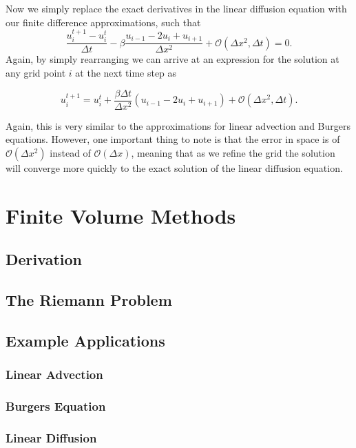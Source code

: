 Now we simply replace the exact derivatives in the linear diffusion equation with our finite difference approximations, such that
\begin{equation}
\frac{u_i^{t+1} - u_{i}^t}{\Delta t} - \beta \frac{u_{i-1} - 2u_i + u_{i+1}}{\Delta x^2} + \mathcal{O}(\Delta x^2,\Delta t) = 0.
\end{equation}
Again, by simply rearranging we can arrive at an expression for the solution at any grid point $i$ at the next time step as
\begin{eqBox}
\begin{equation}
u_i^{t+1}  = u_{i}^t + \frac{\beta \Delta t}{\Delta x^2} \left(u_{i-1} - 2u_i + u_{i+1}\right) + \mathcal{O}(\Delta x^2,\Delta t).
\end{equation}
\end{eqBox}
Again, this is very similar to the approximations for linear advection and Burgers equations. However, one important thing to note is that the error in space is of $\mathcal{O}(\Delta x^2)$ instead of $\mathcal{O}(\Delta x)$, meaning that as we refine the grid the solution will converge more quickly to the exact solution of the linear diffusion equation.

\chapter{Finite Volume Methods}
\section{Derivation}
\section{The Riemann Problem}
\section{Example Applications}
\subsection{Linear Advection}
\subsection{Burgers Equation}
\subsection{Linear Diffusion}

